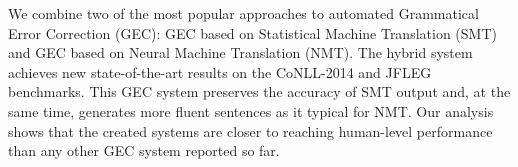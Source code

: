 We combine two of the most popular approaches to automated Grammatical Error Correction (GEC): GEC based on Statistical Machine Translation (SMT) and GEC based on Neural Machine Translation (NMT). The hybrid system achieves new state-of-the-art results on the CoNLL-2014 and JFLEG benchmarks. This GEC system preserves the accuracy of SMT output and, at the same time, generates more fluent sentences as it typical for NMT. Our analysis shows that the created systems are closer to reaching human-level performance than any other GEC system reported so far.
